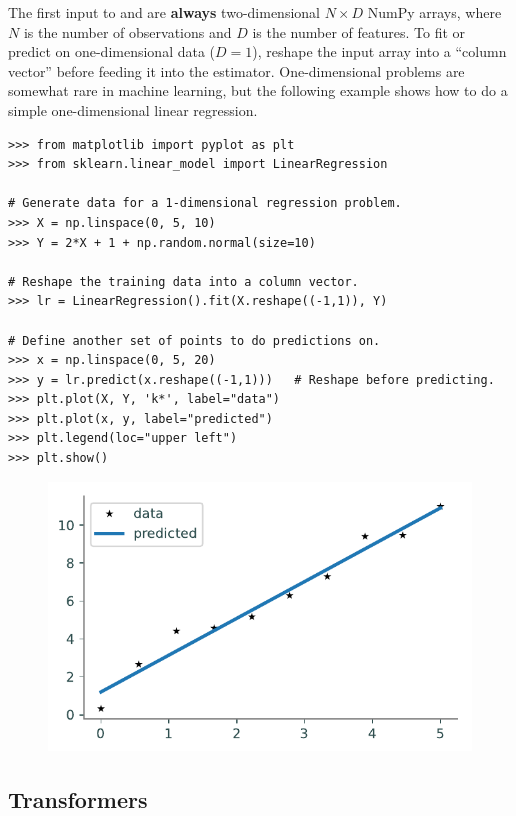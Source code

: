 \begin{info}
The first input to  and  are \textbf{always} two-dimensional $N\times D$ NumPy arrays, where $N$ is the number of observations and $D$ is the number of features.
To fit or predict on one-dimensional data ($D = 1$), reshape the input array into a ``column vector'' before feeding it into the estimator.
One-dimensional problems are somewhat rare in machine learning, but the following example shows how to do a simple one-dimensional linear regression.

\begin{lstlisting}
>>> from matplotlib import pyplot as plt
>>> from sklearn.linear_model import LinearRegression

# Generate data for a 1-dimensional regression problem.
>>> X = np.linspace(0, 5, 10)
>>> Y = 2*X + 1 + np.random.normal(size=10)

# Reshape the training data into a column vector.
>>> lr = LinearRegression().fit(X.reshape((-1,1)), Y)

# Define another set of points to do predictions on.
>>> x = np.linspace(0, 5, 20)
>>> y = lr.predict(x.reshape((-1,1)))   # Reshape before predicting.
>>> plt.plot(X, Y, 'k*', label="data")
>>> plt.plot(x, y, label="predicted")
>>> plt.legend(loc="upper left")
>>> plt.show()
\end{lstlisting}

\begin{figure}[H]
    \centering
    \includegraphics[width=.7\textwidth]{figures/one_d_linear_regression.pdf}
\end{figure}
\end{info}

\subsection*{Transformers} %

